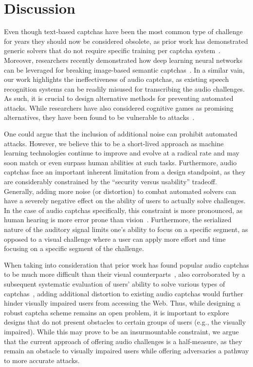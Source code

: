 \section{Discussion}
\label{sec:discussion}

Even though text-based captchas have been the most common type of challenge for years they should now be considered
obsolete, as prior work has demonstrated generic solvers that do not require specific training per captcha system~\cite{185128}.
Moreover, researchers recently demonstrated how deep learning neural networks can be leveraged for breaking image-based 
semantic captchas~\cite{sivakorn:eurosp16}. In a similar vain, our work highlights the ineffectiveness of audio 
captchas, as existing speech recognition systems can be readily misused for transcribing the audio challenges.
As such, it is crucial to design alternative methods for preventing automated attacks. While researchers 
have also considered cognitive games as promising alternatives, they have been found to be vulnerable to 
attacks~\cite{mohamed2017security}.

One could argue that the inclusion of additional noise can prohibit automated attacks. However, we believe this to be
a short-lived approach as machine learning technologies continue to improve and evolve at a radical rate and may soon
match or even surpass human abilities at such tasks.
Furthermore, audio captchas face an important inherent limitation from a design standpoint, as they are considerably
constrained by the ``security versus usability'' tradeoff. Generally, adding more noise (or distortion) 
to combat automated solvers can have a severely negative effect on the ability of users to actually solve challenges.
In the case of audio captchas specifically, this constraint is more pronounced, as human hearing is more error prone 
than vision~\cite{o2009auditory,shinn2008object}. Furthermore, the serialized nature of the auditory signal limits 
one's ability to focus on a specific segment, as opposed to a visual challenge where a user can apply more effort and 
time focusing on a specific segment of the challenge.

When taking into consideration that prior work has found popular audio captchas to be much more difficult 
than their visual counterparts~\cite{bigham2009evaluating}, also corroborated by a subsequent 
systematic evaluation of users' ability to solve various types of captchas~\cite{captchas-are-hard}, adding
additional distortion to existing audio captchas would further hinder visually impaired users from accessing the Web.
Thus, while designing a robust captcha scheme remains an open problem, it is important 
to explore designs that do not present obstacles to certain groups of users (e.g., the visually impaired).
While this may prove to be an insurmountable constraint, we argue that the current approach of offering audio
challenges is a half-measure, as they remain an obstacle to visually impaired users while offering 
adversaries a pathway to more accurate attacks.
